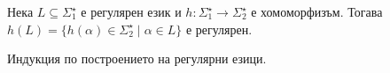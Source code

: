 \begin{problem}
  Нека $L \subseteq \Sigma^\star_1$ е регулярен език и $h:\Sigma^\star_1\to\Sigma^\star_2$ е хомоморфизъм.
  Тогава
  $h(L) = \{h(\alpha) \in \Sigma^\star_2 \mid \alpha \in L\}$ е регулярен.
\end{problem}
\begin{hint}
  Индукция по построението на регулярни езици.
\end{hint}


